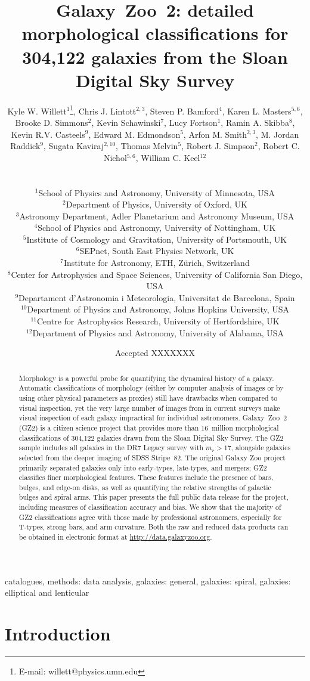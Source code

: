 \documentclass[useAMS,usenatbib]{mn2e}
\title[Galaxy Zoo 2 data release]{Galaxy~Zoo~2: detailed morphological classifications for 304,122 galaxies from the Sloan Digital Sky Survey}
\author[Willett et al.]{
  \parbox[t]{16cm}{
  Kyle W. Willett$^{1}$\thanks{E-mail: willett@physics.umn.edu},
  Chris J. Lintott$^{2,3}$,
  Steven P. Bamford$^{4}$,
  Karen L. Masters$^{5,6}$,
  Brooke D. Simmons$^{2}$,
  Kevin Schawinski$^{7}$,
  Lucy Fortson$^{1}$,
  Ramin A. Skibba$^{8}$,
  Kevin R.V. Casteels$^{9}$,
  Edward M. Edmondson$^{5}$,
  Arfon M. Smith$^{2,3}$,
  M. Jordan Raddick$^{9}$,
  Sugata Kaviraj$^{2,10}$,
  Thomas Melvin$^{5}$,
  Robert J. Simpson$^{2}$,
  Robert C. Nichol$^{5,6}$,
  William C. Keel$^{12}$
  \\
  }\\
$^{1}$School of Physics and Astronomy, University of Minnesota, USA \\
$^{2}$Department of Physics, University of Oxford, UK \\
$^{3}$Astronomy Department, Adler Planetarium and Astronomy Museum, USA \\
$^{4}$School of Physics and Astronomy, University of Nottingham, UK \\
$^{5}$Institute of Cosmology and Gravitation, University of Portsmouth, UK \\
$^{6}$SEPnet, South East Physics Network, UK \\
$^{7}$Institute for Astronomy, ETH, Z\"urich, Switzerland \\
$^{8}$Center for Astrophysics and Space Sciences, University of California San Diego, USA \\
$^{9}$Departament d'Astronomia i Meteorologia, Universitat de Barcelona, Spain \\
$^{10}$Department of Physics and Astronomy, Johns Hopkins University, USA \\
$^{11}$Centre for Astrophysics Research, University of Hertfordshire, UK \\
$^{12}$Department of Physics and Astronomy, University of Alabama, USA \\
}
\begin{document}
\date{Accepted XXXXXXX}

\pagerange{\pageref{firstpage}--\pageref{lastpage}} 

\maketitle

\label{firstpage}

\begin{abstract}
Morphology is a powerful probe for quantifying the dynamical history of a galaxy. Automatic classifications of morphology (either by computer analysis of images or by using other physical parameters as proxies) still have drawbacks when compared to visual inspection, yet the very large number of images from in current surveys make visual inspection of each galaxy impractical for individual astronomers. Galaxy~Zoo~2 (GZ2) is a citizen science project that provides more than 16~million morphological classifications of 304,122 galaxies drawn from the Sloan Digital Sky Survey. The GZ2 sample includes all galaxies in the DR7 Legacy survey with $m_r>17$, alongside galaxies selected from the deeper imaging of SDSS Stripe~82. The original Galaxy Zoo project primarily separated galaxies only into early-types, late-types, and mergers; GZ2 classifies finer morphological features. These features include the presence of bars, bulges, and edge-on disks, as well as quantifying the relative strengths of galactic bulges and spiral arms. This paper presents the full public data release for the project, including measures of classification accuracy and bias. We show that the majority of GZ2 classifications agree with those made by professional astronomers, especially for T-types, strong bars, and arm curvature. Both the raw and reduced data products can be obtained in electronic format at \url{http://data.galaxyzoo.org}.
\end{abstract}

\begin{keywords}
catalogues, methods: data analysis, galaxies: general, galaxies: spiral, galaxies: elliptical and lenticular
\end{keywords}


\section{Introduction} \label{sec-intro}
\end{document}
